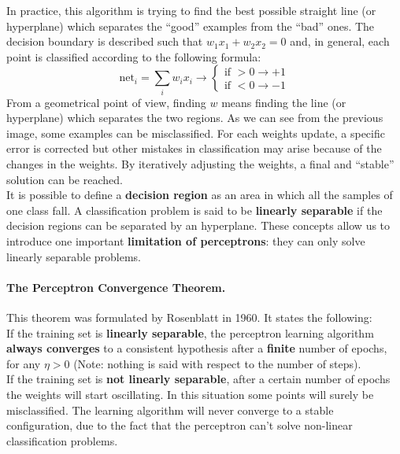 In practice, this algorithm is trying to find the best possible straight line (or hyperplane) which separates the ``good'' examples from the ``bad'' ones. The decision boundary is described such that $w_1x_1 + w_2x_2 = 0$ and, in general, each point is classified according to the following formula:
$$\text{net}_i = \sum_i w_ix_i \rightarrow \begin{cases}
\text{if } >0 \rightarrow +1\\
\text{if } <0 \rightarrow -1
\end{cases}$$
From a geometrical point of view, finding $w$ means finding the line (or hyperplane) which separates the two regions.
As we can see from the previous image, some examples can be misclassified. For each weights update, a specific error is corrected but other mistakes in classification may arise because of the changes in the weights. By iteratively adjusting the weights, a final and ``stable'' solution can be reached.\\
It is possible to define a \textbf{decision region} as an area in which all the samples of one class fall. A classification problem is said to be \textbf{linearly separable} if the decision regions can be separated by an hyperplane. These concepts allow us to introduce one important \textbf{limitation of perceptrons}: they can only solve linearly separable problems.

\paragraph*{The Perceptron Convergence Theorem.} This theorem was formulated by Rosenblatt in 1960. It states the following:\\
If the training set is \textbf{linearly separable}, the perceptron learning algorithm \textbf{always converges} to a consistent hypothesis after a \textbf{finite} number of epochs, for any $\eta > 0$ (Note: nothing is said with respect to the number of steps).\\
If the training set is \textbf{not linearly separable}, after a certain number of epochs the weights will start oscillating. In this situation some points will surely be misclassified. The learning algorithm will never converge to a stable configuration, due to the fact that the perceptron can't solve non-linear classification problems.

\par \bigskip \noindent
